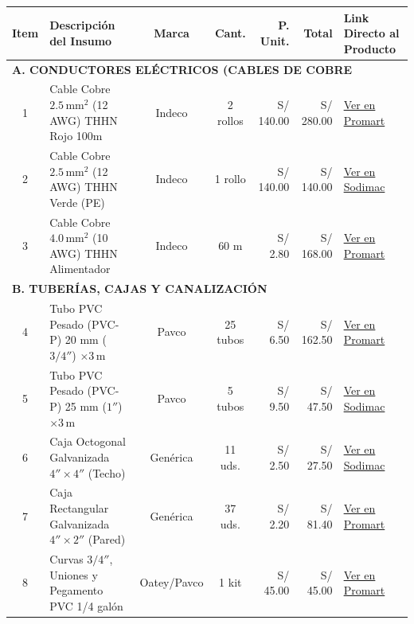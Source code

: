 \documentclass[11pt,a4paper]{article}
\begin{document}
\begin{table}[H]
\centering
\scriptsize
\begin{tabularx}{\textwidth}{c X c c r r X}
\toprule
\textbf{Item} & \textbf{Descripción del Insumo} & \textbf{Marca} & \textbf{Cant.} & \textbf{P. Unit.} & \textbf{Total} & \textbf{Link Directo al Producto} \\
\midrule
\multicolumn{7}{l}{\textbf{\color{AccentBlue}\textbf{A. CONDUCTORES ELÉCTRICOS (CABLES DE COBRE}}} \\
\midrule
1 & Cable Cobre $2.5\,\text{mm}^2$ (12 AWG) THHN Rojo 100m & Indeco & 2 rollos & S/ 140.00 & S/ 280.00 & \href{https://www.promart.pe/cable-electrico-thhn-2-5-mm2-rojo-rollo-100-m-indeco-10884/p}{Ver en Promart} \\
2 & Cable Cobre $2.5\,\text{mm}^2$ (12 AWG) THHN Verde (PE) & Indeco & 1 rollo & S/ 140.00 & S/ 140.00 & \href{https://www.sodimac.com.pe/sodimac-pe/product/2084725/cable-libre-de-halogenos-2.5-mm2-verde-100-m-indeco/2084725}{Ver en Sodimac} \\
3 & Cable Cobre $4.0\,\text{mm}^2$ (10 AWG) THHN Alimentador & Indeco & 60 m & S/ 2.80 & S/ 168.00 & \href{https://www.promart.pe/cable-electrico-thhn-4-mm2-negro-por-metro-indeco-10892/p}{Ver en Promart} \\
\midrule
\multicolumn{7}{l}{\textbf{\color{AccentBlue}\textbf{B. TUBERÍAS, CAJAS Y CANALIZACIÓN}}} \\
4 & Tubo PVC Pesado (PVC-P) 20 mm ($3/4''$) $\times 3\,\text{m}$ & Pavco & 25 tubos & S/ 6.50 & S/ 162.50 & \href{https://www.promart.pe/tubo-pvc-sel-3-4-x-3-m-pavco-32948/p}{Ver en Promart} \\
5 & Tubo PVC Pesado (PVC-P) 25 mm ($1''$) $\times 3\,\text{m}$ & Pavco & 5 tubos & S/ 9.50 & S/ 47.50 & \href{https://www.sodimac.com.pe/sodimac-pe/product/128392/tubo-pvc-sap-1-x-3-m-pavco/128392}{Ver en Sodimac} \\
6 & Caja Octogonal Galvanizada $4'' \times 4''$ (Techo) & Genérica & 11 uds. & S/ 2.50 & S/ 27.50 & \href{https://www.sodimac.com.pe/sodimac-pe/product/182941/caja-octogonal-galvanizada/182941}{Ver en Sodimac} \\
7 & Caja Rectangular Galvanizada $4'' \times 2''$ (Pared) & Genérica & 37 uds. & S/ 2.20 & S/ 81.40 & \href{https://www.promart.pe/caja-rectangular-galvanizada-10291/p}{Ver en Promart} \\
8 & Curvas $3/4''$, Uniones y Pegamento PVC 1/4 galón & Oatey/Pavco & 1 kit & S/ 45.00 & S/ 45.00 & \href{https://www.promart.pe/pegamento-pvc-oatey-1-4-galon-30291/p}{Ver en Promart} \\

\end{tabularx}
\end{table}
\end{document}
